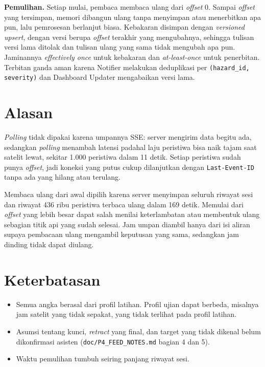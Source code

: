 \textbf{Pemulihan.} Setiap mulai, pembaca membaca ulang dari \textit{offset} 0. Sampai \textit{offset} yang tersimpan, memori dibangun ulang tanpa menyimpan atau menerbitkan apa pun, lalu pemrosesan berlanjut biasa. Kebakaran disimpan dengan \textit{versioned upsert}, dengan versi berupa \textit{offset} terakhir yang mengubahnya, sehingga tulisan versi lama ditolak dan tulisan ulang yang sama tidak mengubah apa pun. Jaminannya \textit{effectively once} untuk kebakaran dan \textit{at-least-once} untuk penerbitan. Terbitan ganda aman karena Notifier melakukan deduplikasi per \texttt{(hazard\_id, severity)} dan Dashboard Updater mengabaikan versi lama.

\section{Alasan}

\textit{Polling} tidak dipakai karena umpannya SSE: server mengirim data begitu ada, sedangkan \textit{polling} menambah latensi padahal laju peristiwa bisa naik tajam saat satelit lewat, sekitar 1.000 peristiwa dalam 11 detik. Setiap peristiwa sudah punya \textit{offset}, jadi koneksi yang putus cukup dilanjutkan dengan \texttt{Last-Event-ID} tanpa ada yang hilang atau terulang.

Membaca ulang dari awal dipilih karena server menyimpan seluruh riwayat sesi dan riwayat 436 ribu peristiwa terbaca ulang dalam 169 detik. Memulai dari \textit{offset} yang lebih besar dapat salah menilai keterlambatan atau membentuk ulang sebagian titik api yang sudah selesai. Jam umpan diambil hanya dari isi aliran supaya pembacaan ulang mengambil keputusan yang sama, sedangkan jam dinding tidak dapat diulang.

\section{Keterbatasan}

\begin{itemize}
\item Semua angka berasal dari profil latihan. Profil ujian dapat berbeda, misalnya jam satelit yang tidak sepakat, yang tidak terlihat pada profil latihan.
\item Asumsi tentang kunci, \textit{retract} yang final, dan target yang tidak dikenal belum dikonfirmasi asisten (\texttt{doc/P4\_FEED\_NOTES.md} bagian 4 dan 5).
\item Waktu pemulihan tumbuh seiring panjang riwayat sesi.
\end{itemize}

